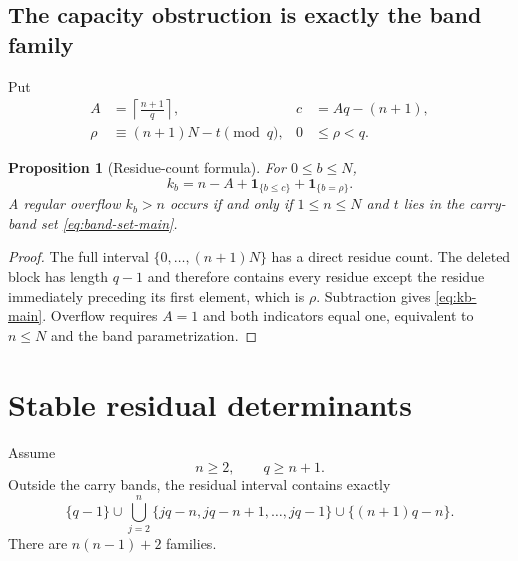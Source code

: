 \documentclass[11pt]{amsart}
\newcommand{\1}{\mathbf 1}
\newtheorem{proposition}[theorem]{Proposition}
\theoremstyle{remark}
\begin{document}
\subsection{The capacity obstruction is exactly the band family}
Put
\begin{align*}
 A&=\left\lceil\frac{n+1}{q}\right\rceil,
 &c&=Aq-(n+1),\\
 \rho&\equiv(n+1)N-t\pmod q,
 &0&\le\rho<q.
\end{align*}

\begin{proposition}[Residue-count formula]\label{prop:residue-count}
For $0\le b\le N$,
\begin{equation}\label{eq:kb-main}
 k_b=n-A+\mathbf1_{\{b\le c\}}+\mathbf1_{\{b=\rho\}}.
\end{equation}
A regular overflow $k_b>n$ occurs if and only if $1\le n\le N$ and $t$ lies in the carry-band set \eqref{eq:band-set-main}.
\end{proposition}

\begin{proof}
The full interval $\{0,\ldots,(n+1)N\}$ has a direct residue count. The deleted block has length $q-1$ and therefore contains every residue except the residue immediately preceding its first element, which is $\rho$. Subtraction gives \eqref{eq:kb-main}. Overflow requires $A=1$ and both indicators equal one, equivalent to $n\le N$ and the band parametrization.
\end{proof}

\section{Stable residual determinants}
\label{sec:stable}

Assume
\begin{equation}\label{eq:stable-main}
 n\ge2,\qquad q\ge n+1.
\end{equation}
Outside the carry bands, the residual interval contains exactly
\begin{equation}\label{eq:stable-thresholds-main}
 \{q-1\}\cup\bigcup_{j=2}^{n}\{jq-n,jq-n+1,\ldots,jq-1\}
 \cup\{(n+1)q-n\}.
\end{equation}
There are $n(n-1)+2$ families.
\end{document}
